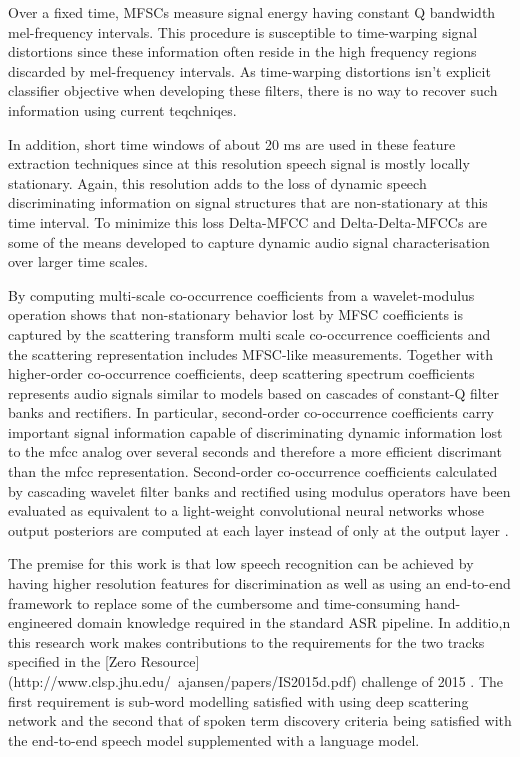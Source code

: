 Over a fixed time, MFSCs measure signal energy having constant Q bandwidth mel-frequency intervals.  This procedure is susceptible to time-warping signal distortions since these information often reside in the high frequency regions discarded by mel-frequency intervals.  As time-warping distortions isn't explicit classifier objective when developing these filters, there is no way to recover such information using current teqchniqes. 

In addition, short time windows of about 20 ms are used in these feature extraction techniques since at this resolution speech signal is mostly locally stationary.  Again, this resolution adds to the loss of dynamic speech discriminating information on signal structures that are non-stationary at this time interval. To minimize this loss Delta-MFCC and Delta-Delta-MFCCs \citep{furui1986speaker} are some of the means developed to capture dynamic audio signal characterisation over  larger time scales.

By computing multi-scale co-occurrence coefficients from a wavelet-modulus operation \cite{anden2011multiscale} shows that non-stationary behavior lost by MFSC coefficients is captured by the scattering transform multi scale co-occurrence coefficients and the scattering representation includes MFSC-like measurements.  Together with higher-order co-occurrence coefficients, deep scattering spectrum coefficients represents audio signals similar to  models based on cascades of constant-Q filter banks and rectifiers.  In particular, second-order co-occurrence coefficients carry important  signal information capable of discriminating dynamic information lost to the mfcc analog over several seconds and therefore a more efficient discrimant than the mfcc representation. Second-order co-occurrence coefficients calculated by cascading wavelet filter banks and rectified using modulus operators have been evaluated as equivalent to a light-weight convolutional neural networks whose output posteriors are computed at each layer instead of only at the output layer \cite{mallat2016understanding}.

The premise for this work is that low speech recognition can be achieved by having higher resolution features for discrimination as well as using an end-to-end framework to replace some of the cumbersome and time-consuming hand-engineered domain knowledge required in the standard ASR pipeline.  In additio,n this research work makes contributions to the requirements for the two tracks specified in the [Zero Resource](http://www.clsp.jhu.edu/~ajansen/papers/IS2015d.pdf) challenge of 2015 \citep{versteegh2015zero}.  The first requirement is sub-word modelling satisfied with using deep scattering network and the second that of spoken term discovery criteria being satisfied with the end-to-end speech model supplemented with a language model.

